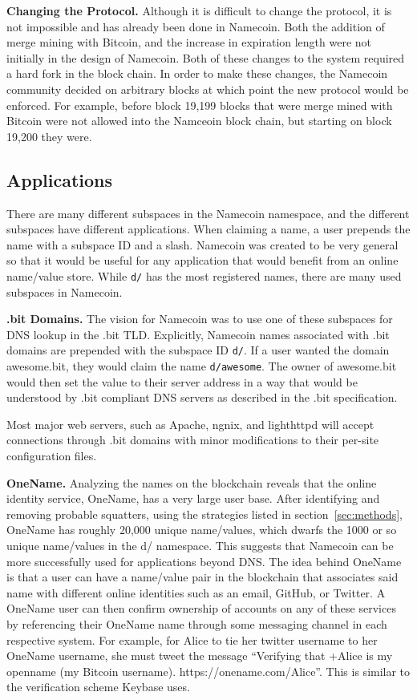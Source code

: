 {\bf Changing the Protocol.}
Although it is difficult to change the protocol, it is not impossible and has already been done in Namecoin. Both the addition of merge mining with Bitcoin, and the increase in expiration length were not initially in the design of Namecoin. Both of these changes to the system required a hard fork in the block chain. In order to make these changes, the Namecoin community decided on arbitrary blocks at which point the new protocol would be enforced. For example, before block 19,199 blocks that were merge mined with Bitcoin were not allowed into the Namceoin block chain, but starting on block 19,200 they were. 
 
\subsection{Applications}

There are many different subspaces in the Namecoin namespace, and the different subspaces have different applications. When claiming a name, a user prepends the name with a subspace ID and a slash. Namecoin was created to be very general so that it would be useful for any application that would benefit from an online name/value store. While {\tt d/} has the most registered names, there are many used subspaces in Namecoin.

{\bf .bit Domains.}
The vision for Namecoin was to use one of these subspaces for DNS lookup in the .bit TLD. Explicitly, Namecoin names associated with .bit domains are prepended with the subspace ID {\tt d/}. If a user wanted the domain awesome.bit, they would claim the name {\tt d/awesome}. The owner of awesome.bit would then set the value to their server address in a way that would be understood by .bit compliant DNS servers as described in the .bit specification\cite{bitdnsspec}.

Most major web servers, such as Apache, ngnix, and lighthttpd will accept connections through .bit domains with minor modifications to their per-site configuration files.

{\bf OneName.}
Analyzing the names on the blockchain reveals that the online identity service, OneName, has a very large user base. After identifying and removing probable squatters, using the strategies listed in section~\ref{sec:methods}, OneName has roughly 20,000 unique name/values, which dwarfs the 1000 or so unique name/values in the d/ namespace. This suggests that Namecoin can be more successfully used for applications beyond DNS. The idea behind OneName is that a user can have a name/value pair in the blockchain that associates said name with different online identities such as an email, GitHub, or Twitter. A OneName user can then confirm ownership of accounts on any of these services by referencing their OneName name through some messaging channel in each respective system. For example, for Alice to tie her twitter username to her OneName username, she must tweet the message ``Verifying that +Alice is my openname (my Bitcoin username). https://onename.com/Alice''. This is similar to the verification scheme Keybase uses.


